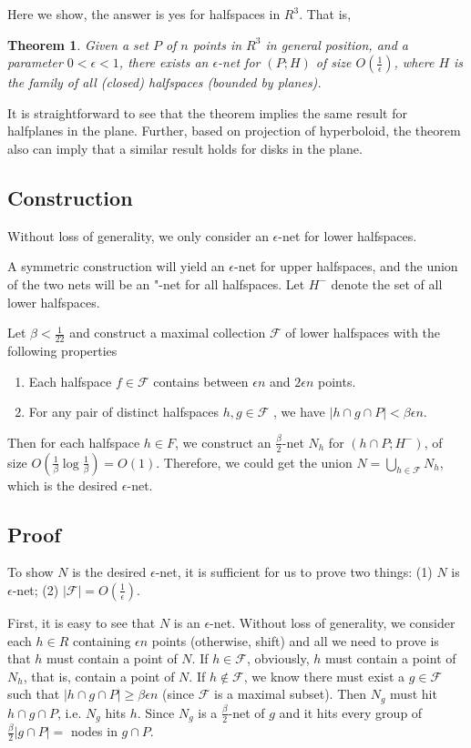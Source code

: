 \documentclass[11pt]{article}
\newtheorem{theorem}[lemma]{Theorem}
\begin{document}
Here we show, the answer is yes for halfspaces in $R^3$. That is, 
\begin{theorem}\cite{har2014epsilon}
	Given a set $P$ of $n$ points in $R^3$ in general position, and a parameter $0 <  \epsilon<1$, there
	exists an $\epsilon$-net for $(P;H)$ of size $O(\frac{1}{\epsilon})$, where $H$ is the family of all (closed) halfspaces
	(bounded by planes).
\end{theorem} 
It is straightforward to see that the theorem implies the same result for halfplanes in the plane. 
Further, based on projection of hyperboloid, the theorem also can imply that a similar result holds for disks in the plane. 


\subsection{Construction}
Without loss of generality, we only consider an $\epsilon$-net for lower halfspaces.

A symmetric construction will yield an $\epsilon$-net for upper halfspaces, and the union of the two nets will be
an "-net for all halfspaces. Let $H^-$ denote the set of all lower halfspaces.

\newcommand{\F}{\mathcal{F}}
Let $\beta<\frac {1} {22}$ and construct  a maximal collection $\F$ of lower halfspaces with the following properties 
\begin{enumerate}
	\item Each halfspace  $f\in \F$ contains between $\epsilon n$ and $2\epsilon n$ points.
	\item For any pair of distinct halfspaces $h,g\in \F$ , we have $ |h\cap g\cap P |< \beta \epsilon n$.
\end{enumerate}



Then for each halfspace $h \in F$, we construct an $\frac{\beta}{2}$-net $N_h$ for  $(h \cap P;H^-)$, of size
	$O(\frac{1}{\beta}\log \frac{1}{\beta})=O(1)$.
Therefore, we could get the union $N=\bigcup_{h\in\F} N_h$, which is the desired $\epsilon$-net.

\subsection{Proof}
To show $N$ is the desired $\epsilon$-net, 
	it is sufficient for us to prove two things: (1) $N$ is $\epsilon$-net; (2) $|\F|=O(\frac{1}{\epsilon})$. 

First, it is easy to see that $N$ is an $\epsilon$-net.
Without loss of generality, we consider each $h\in R$ containing $\epsilon n$ points (otherwise, shift) and
	all we need to prove is that $h$ must contain a point of $N$.
If $h\in \F$, obviously, $ h$ must contain a point of $N_h$, that is, contain a point of $N$.
If $h\not\in \F$, we know there must exist a $g\in \F$ such that $|h\cap g\cap P|\geq \beta \epsilon n$ (since $\F$ is a maximal subset). 
Then $N_g$ must hit $h\cap g\cap P$, i.e. $N_g$ hits $h$. 
Since $N_g$ is a $\frac{\beta}{2}$-net of $g$ and it hits every group of $\frac{\beta}{2}|g\cap P|= $ nodes in $g\cap P$. 
\end{document}
